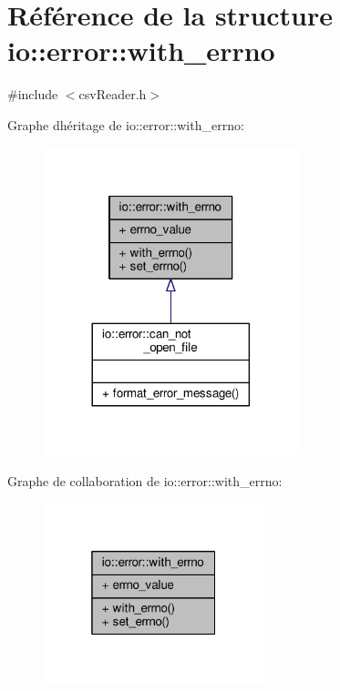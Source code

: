 \hypertarget{structio_1_1error_1_1with__errno}{}\section{Référence de la structure io\+:\+:error\+:\+:with\+\_\+errno}
\label{structio_1_1error_1_1with__errno}


{\ttfamily \#include $<$csv\+Reader.\+h$>$}



Graphe d\textquotesingle{}héritage de io\+:\+:error\+:\+:with\+\_\+errno\+:\nopagebreak
\begin{figure}[H]
\begin{center}
\leavevmode
\includegraphics[width=209pt]{structio_1_1error_1_1with__errno__inherit__graph}
\end{center}
\end{figure}


Graphe de collaboration de io\+:\+:error\+:\+:with\+\_\+errno\+:\nopagebreak
\begin{figure}[H]
\begin{center}
\leavevmode
\includegraphics[width=181pt]{structio_1_1error_1_1with__errno__coll__graph}
\end{center}
\end{figure}
